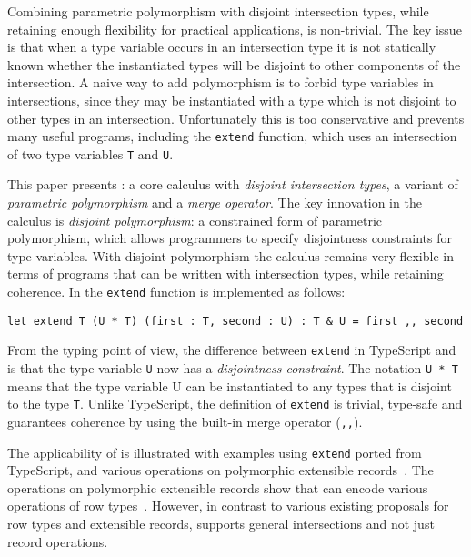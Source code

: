 Combining parametric polymorphism with disjoint intersection
types, while retaining enough flexibility for practical applications,
is non-trivial. The key issue is that when a type variable occurs in an intersection
type it is not statically known whether the instantiated types will
be disjoint to other components of the intersection.
A naive way  to add polymorphism is to forbid 
type variables in intersections, since they may be instantiated with 
a type which is not disjoint to other types in an intersection.
Unfortunately this is too conservative and prevents many useful 
programs, including the \lstinline{extend} function, which uses an
intersection of two type variables \lstinline{T} and \lstinline{U}. 


This paper presents \name: a core calculus with 
\emph{disjoint intersection types}, a variant of \emph{parametric polymorphism} and a
\emph{merge operator}. The key innovation in the calculus is \emph{disjoint polymorphism}: a
constrained form of parametric polymorphism, which allows programmers
to specify disjointness constraints for type variables. With disjoint
polymorphism the calculus remains very flexible in terms of programs
that can be written with intersection types, while retaining
coherence. In \name the \lstinline{extend} function is implemented
as follows:

\begin{lstlisting}
let extend T (U * T) (first : T, second : U) : T & U = first ,, second 
\end{lstlisting}

\noindent From the typing point of view, the difference between
\lstinline{extend} in TypeScript and \name is that the type variable
\lstinline{U} now has a \emph{disjointness constraint}. The notation
\lstinline{U * T} means that the type variable U can be instantiated
to any types that is disjoint to the type \lstinline{T}. Unlike
TypeScript, the definition of \lstinline{extend} is trivial, type-safe
and guarantees coherence by using the built-in merge operator (\lstinline{,,}). 

The applicability of \name is illustrated with examples using \lstinline{extend} 
ported from TypeScript, and various operations on polymorphic
extensible records~\cite{leijen2005extensible,harper1991record,jones99lightweight}. 
The operations on polymorphic extensible records
show that \name can encode various operations of row
types~\cite{wand1987complete}. However, in contrast to various existing proposals for 
row types and extensible records, \name supports general intersections 
and not just record operations.

